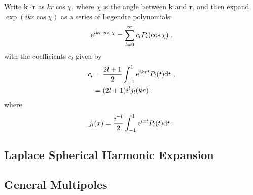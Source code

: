 \documentclass[12pt,a4paper]{article}
\renewcommand{\vec}[1]{\boldsymbol{#1}}
\newcommand{\dif}{\mathrm{d}}
\begin{document}
Write $\vec{k}\cdot \vec{r}$ as $kr \cos \chi$, where $\chi$ is the angle between $\vec{k}$ and $\vec{r}$, and then expand $\exp(ikr \cos \chi)$ as a series of Legendre polynomials:
\begin{equation}
{\rm e}^{ikr \cos \chi} = \sum_{l=0}^\infty c_l P_l (\cos \chi) ~,
\end{equation}
with the coefficients $c_l$ given by
\begin{align}
c_l &= \dfrac{2l+1}{2} \int_{-1}^1 {\rm e}^{ikrt} P_l(t) \dif t ~, \\
&= (2l+1) i^l j_l(kr) ~.
\end{align}
where
\begin{equation}
j_l(x) = \dfrac{i^{-l}}{2} \int_{-1}^1 {\rm e}^{ixt} P_l(t) \dif t ~.
\end{equation}




















\subsection{Laplace Spherical Harmonic Expansion}


























\subsection{General Multipoles}
\end{document}
